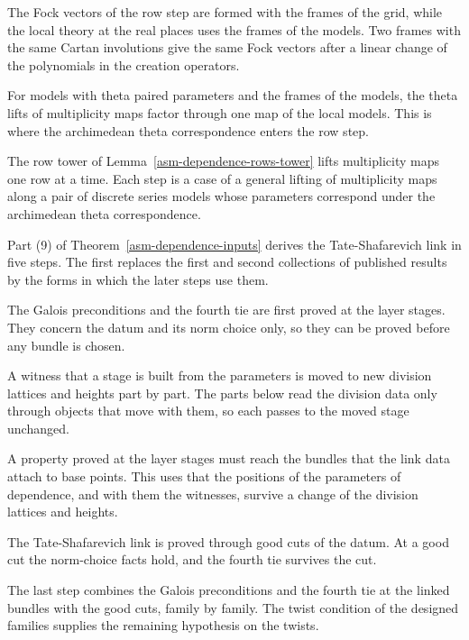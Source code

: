 The Fock vectors of the row step are formed with the frames of the grid, while
the local theory at the real places uses the frames of the models. Two frames
with the same Cartan involutions give the same Fock vectors after a linear
change of the polynomials in the creation operators.

For models with theta paired parameters and the frames of the models, the theta
lifts of multiplicity maps factor through one map of the local models. This is
where the archimedean theta correspondence enters the row step.

The row tower of Lemma~\ref{asm-dependence-rows-tower} lifts multiplicity maps
one row at a time. Each step is a case of a general lifting of multiplicity
maps along a pair of discrete series models whose parameters correspond under
the archimedean theta correspondence.

Part (9) of Theorem~\ref{asm-dependence-inputs} derives the Tate-Shafarevich
link in five steps. The first replaces the first and second collections of
published results by the forms in which the later steps use them.

The Galois preconditions and the fourth tie are first proved at the layer
stages. They concern the datum and its norm choice only, so they can be proved
before any bundle is chosen.

A witness that a stage is built from the parameters is moved to new division
lattices and heights part by part. The parts below read the division data only
through objects that move with them, so each passes to the moved stage
unchanged.

A property proved at the layer stages must reach the bundles that the link data
attach to base points. This uses that the positions of the parameters of
dependence, and with them the witnesses, survive a change of the division
lattices and heights.

The Tate-Shafarevich link is proved through good cuts of the datum. At a good
cut the norm-choice facts hold, and the fourth tie survives the cut.

The last step combines the Galois preconditions and the fourth tie at the linked
bundles with the good cuts, family by family. The twist condition of the
designed families supplies the remaining hypothesis on the twists.

